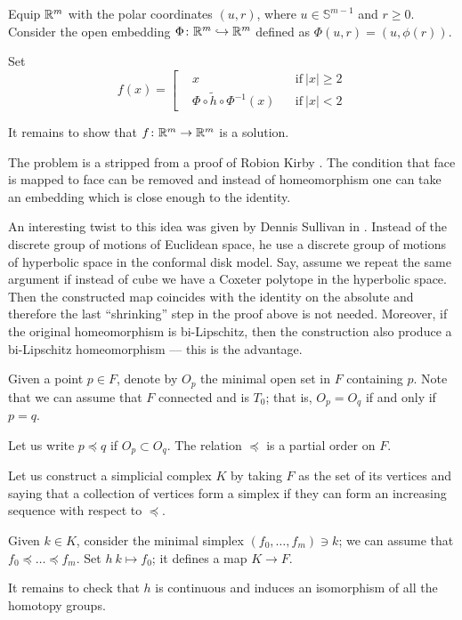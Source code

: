 Equip $\mathbb{R}^m$ with the polar coordinates $(u,r)$, 
where $u\in\mathbb{S}^{m-1}$ and $r\ge 0$.
Consider the open embedding $\Phi\colon\mathbb{R}^m\hookrightarrow\mathbb{R}^m$
defined as $\Phi(u,r)=(u,\phi(r))$.

Set 
\[
f(x)=\left[
\begin{aligned}
&x&&\text{if}\ |x|\ge 2
\\
&\Phi\circ \tilde h \circ \Phi^{-1}(x)&&\text{if}\ |x|< 2
\end{aligned}
\right.
\]

It remains to show that $f\colon\mathbb{R}^m\to\mathbb{R}^m$ is a solution.
\qeds

The problem is a stripped from a proof of Robion Kirby \cite[see][]{kirby}.
The condition that face is mapped to face can be removed and 
instead of homeomorphism one can take an embedding which is close enough to the identity.

An interesting twist to this idea was given by Dennis Sullivan in \cite{sullivan}.
Instead of the discrete group of motions of Euclidean space,
he use a discrete group of motions of hyperbolic space in the conformal disk model.
Say, assume we repeat the same argument if instead of cube we have a Coxeter polytope in the hyperbolic space.
Then the constructed map 
coincides with the identity on the absolute and therefore the last ``shrinking'' step in the proof above is not needed.
Moreover, 
if the original homeomorphism is bi-Lipschitz,
then the construction also produce a bi-Lipschitz homeomorphism ---
this is the advantage.
  

Given a point $p\in F$,
denote by $O_p$ the minimal open set in $F$ containing $p$. 
Note that we can assume that $F$ connected and is $T_0$;
that is, $O_p=O_q$ if and only if $p=q$.

Let us write $p\preccurlyeq q$ 
if $O_p\subset O_q$.
The relation $\preccurlyeq$ is a partial order on $F$.

Let us construct a simplicial complex $K$ 
by taking $F$ as the set of its vertices
and saying that a collection of vertices form a simplex 
if they can form an increasing sequence with respect to $\preccurlyeq$.

Given $k\in K$,
consider the minimal simplex $(f_0,\dots,f_m)\ni k$;
we can assume that $f_0\preccurlyeq \dots\preccurlyeq f_m$.
Set $h\:k\mapsto f_0$;
it defines a map $K\to F$.

It remains to check that $h$ is continuous 
and induces an isomorphism of all the homotopy groups.
\qeds

